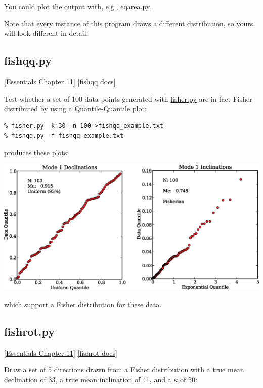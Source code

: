 \documentclass[11pt]{book}
\begin{document}
{{  You could plot the output with, e.g., \href{#eqarea.py}{eqarea.py}.

  Note that every instance of this program draws a different distribution, so yours will look different in detail.


\subsection{fishqq.py}
\href{http://earthref.org/MAGIC/books/Tauxe/Essentials/WebBook3ch11.html#ch11}{ [Essentials Chapter 11]}
\href{https://github.com/PmagPy/PmagPy/blob/master/programs/fishqq.py}{[fishqq docs]}

Test whether a set of 100 data points generated with \href{#fisher.py}{fisher.py} are in fact Fisher distributed by using a Quantile-Quantile plot:

\begin{verbatim}
% fisher.py -k 30 -n 100 >fishqq_example.txt
% fishqq.py -f fishqq_example.txt
\end{verbatim}

\noindent produces these plots:



\includegraphics[width=15cm]{EPSfiles/fishqq-ex.eps}

\noindent which support a Fisher distribution for these data.



\subsection{fishrot.py}
\href{http://earthref.org/MAGIC/books/Tauxe/Essentials/WebBook3ch11.html#ch11}{ [Essentials Chapter 11]}
\href{https://github.com/PmagPy/PmagPy/blob/master/programs/fishrot.py}{[fishrot docs]}

Draw a set of 5 directions drawn  from a Fisher distribution with a true mean declination of 33, a true mean inclination of 41, and a $\kappa$ of  50:

}}
\end{document}
